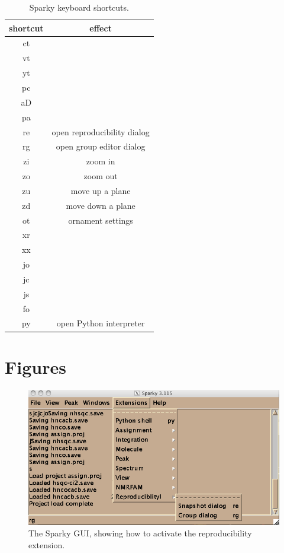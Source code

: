 \begin{table}[h]
  \begin{tabular}{ | c | c | }
    \hline
    shortcut    &   effect      \\  \hline
    ct      &       \\  \hline
    vt      &       \\  \hline
    yt      &       \\  \hline
    pc      &       \\  \hline
    aD      &       \\  \hline
    pa      &       \\  \hline
    re      &  open reproducibility dialog     \\  \hline
    rg      &  open group editor dialog     \\  \hline
    zi      &  zoom in     \\  \hline
    zo      &  zoom out     \\  \hline
    zu      &  move up a plane     \\  \hline
    zd      &  move down a plane     \\  \hline
    ot      &  ornament settings     \\  \hline
    xr      &       \\  \hline
    xx      &       \\  \hline
    jo      &       \\  \hline
    jc      &       \\  \hline
    js      &       \\  \hline
    fo      &       \\  \hline
    py      &  open Python interpreter  \\  \hline
  \end{tabular}
  \caption{Sparky keyboard shortcuts.}
  \label{sparky_shortcuts}
\end{table}



\clearpage
\section{Figures}

\begin{figure}[h]
  \includegraphics[scale=0.6]{figures/sparky_extensions}
  \caption{The Sparky GUI, showing how to activate the reproducibility
           extension.}
  \label{sparky_extensions}
\end{figure}

